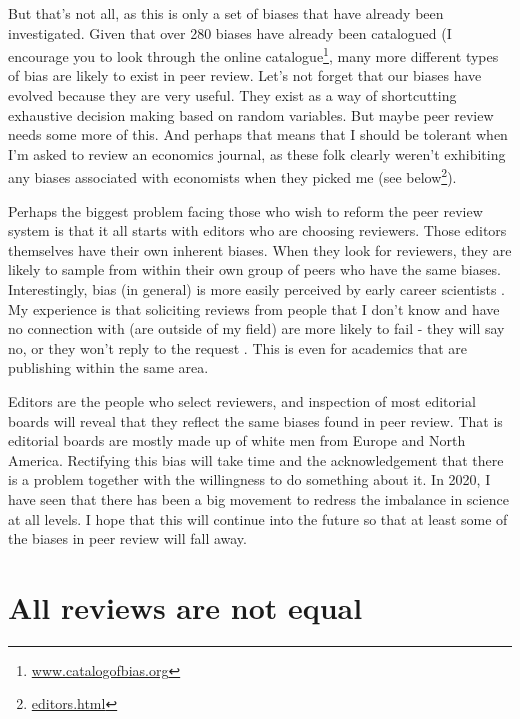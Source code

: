 \documentclass[
]{krantz}
\renewcommand{\href}[2]{#2\footnote{\url{#1}}}
\begin{document}
But that's not all, as this is only a set of biases that have already been investigated. Given that over 280 biases have already been catalogued (I encourage you to look through the \href{www.catalogofbias.org}{online catalogue}, many more different types of bias are likely to exist in peer review. Let's not forget that our biases have evolved because they are very useful. They exist as a way of shortcutting exhaustive decision making based on random variables. But maybe peer review needs some more of this. And perhaps that means that I should be tolerant when I'm asked to review an economics journal, as these folk clearly weren't exhibiting any biases associated with economists when they picked me (see \href{editors.html}{below}).

Perhaps the biggest problem facing those who wish to reform the peer review system is that it all starts with editors who are choosing reviewers. Those editors themselves have their own inherent biases. When they look for reviewers, they are likely to sample from within their own group of peers who have the same biases. Interestingly, bias (in general) is more easily perceived by early career scientists \citep{zvereva2021biases}. My experience is that soliciting reviews from people that I don't know and have no connection with (are outside of my field) are more likely to fail - they will say no, or they won't reply to the request \citep{perry2012peer}. This is even for academics that are publishing within the same area.

Editors are the people who select reviewers, and inspection of most editorial boards will reveal that they reflect the same biases found in peer review. That is editorial boards are mostly made up of white men from Europe and North America. Rectifying this bias will take time and the acknowledgement that there is a problem together with the willingness to do something about it. In 2020, I have seen that there has been a big movement to redress the imbalance in science at all levels. I hope that this will continue into the future so that at least some of the biases in peer review will fall away.

\hypertarget{all-reviews-are-not-equal}{%
\section{All reviews are not equal}\label{all-reviews-are-not-equal}}
\end{document}
